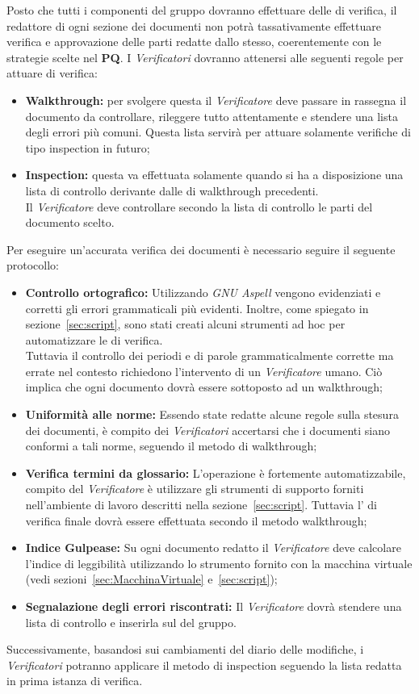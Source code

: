 \documentclass{scalatekids-article}
\begin{document}
Posto che tutti i componenti del gruppo dovranno effettuare delle  di
verifica, il redattore di ogni sezione dei documenti non potrà tassativamente
effettuare verifica e approvazione delle parti redatte dallo stesso,
coerentemente con le strategie scelte nel \textbf{PQ}.
I \textit{Verificatori} dovranno attenersi alle seguenti regole per attuare  di verifica:
\begin{itemize}
\item \textbf{Walkthrough:} per svolgere questa  il \textit{Verificatore} deve passare in rassegna il documento da controllare, rileggere tutto attentamente e stendere una lista degli errori più comuni. Questa lista servirà per attuare solamente verifiche di tipo inspection in futuro;
\item \textbf{Inspection:} questa  va effettuata solamente quando si ha a disposizione una lista di controllo derivante dalle  di walkthrough precedenti.\\
  Il \textit{Verificatore} deve controllare secondo la lista di controllo le parti del documento scelto.
\end{itemize}
Per eseguire un'accurata verifica dei documenti è necessario seguire il seguente
protocollo:
\begin{itemize}
\item\textbf{Controllo ortografico:} Utilizzando \textit{GNU Aspell} vengono evidenziati e corretti
  gli errori grammaticali più evidenti. Inoltre, come spiegato in sezione~\ref{sec:script}, sono stati
  creati alcuni strumenti ad hoc per automatizzare le  di verifica.\\
  Tuttavia il controllo dei periodi e di parole grammaticalmente corrette ma errate nel contesto richiedono
  l'intervento di un \textit{Verificatore} umano. Ciò implica che ogni documento dovrà essere sottoposto ad un walkthrough;
\item\textbf{Uniformità alle norme:} Essendo state redatte alcune regole sulla stesura dei documenti, è compito dei \textit{Verificatori}
  accertarsi che i documenti siano conformi a tali norme, seguendo il metodo di walkthrough;
\item\textbf{Verifica termini da glossario:} L'operazione è fortemente automatizzabile, compito del \textit{Verificatore} è utilizzare gli strumenti di supporto
  forniti nell'ambiente di lavoro descritti nella sezione~\ref{sec:script}. Tuttavia l' di verifica finale dovrà essere effettuata secondo il metodo
  walkthrough;
\item\textbf{Indice Gulpease:} Su ogni documento redatto il \textit{Verificatore} deve calcolare l'indice di leggibilità utilizzando lo strumento fornito
  con la macchina virtuale (vedi sezioni~\ref{sec:MacchinaVirtuale} e~\ref{sec:script});
\item\textbf{Segnalazione degli errori riscontrati:} Il \textit{Verificatore} dovrà stendere una lista di controllo e inserirla sul  del gruppo.
\end{itemize}
Successivamente, basandosi sui cambiamenti del diario delle modifiche, i
\textit{Verificatori} potranno applicare il metodo di inspection seguendo la
lista redatta in prima istanza di verifica.
\end{document}

